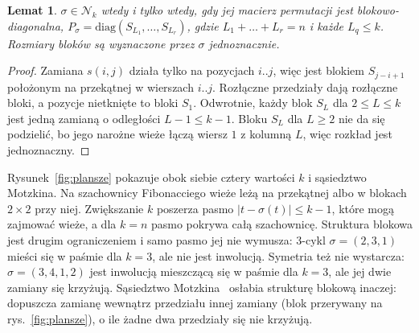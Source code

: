 \documentclass[letterpaper]{article} %
\newtheorem{lemma}{Lemat}
\theoremstyle{definition}
\newcommand{\N}{\mathcal{N}}
\begin{document}
\begin{lemma}\label{lem:bloki}
$\sigma\in\N_k$ wtedy i tylko wtedy, gdy jej macierz permutacji jest
blokowo-diagonalna, $P_\sigma=\mathrm{diag}(S_{L_1},\dots,S_{L_r})$, gdzie
$L_1+\dots+L_r=n$ i każde $L_q\leq k$. Rozmiary bloków są wyznaczone
przez $\sigma$ jednoznacznie.
\end{lemma}
\begin{proof}
Zamiana $s(i,j)$ działa tylko na pozycjach $i..j$, więc jest blokiem
$S_{j-i+1}$ położonym na przekątnej w wierszach $i..j$. Rozłączne
przedziały dają rozłączne bloki, a pozycje nietknięte to bloki $S_1$.
Odwrotnie, każdy blok $S_L$ dla $2\leq L\leq k$ jest jedną zamianą
o odległości $L-1\leq k-1$. Bloku $S_L$ dla $L\geq 2$ nie da się
podzielić, bo jego narożne wieże łączą wiersz $1$ z kolumną $L$, więc
rozkład jest jednoznaczny.
\end{proof}

Rysunek~\ref{fig:plansze} pokazuje obok siebie cztery wartości $k$ i sąsiedztwo Motzkina. Na szachownicy Fibonacciego wieże leżą na przekątnej albo w blokach $2\times 2$ przy niej. Zwiększanie $k$
poszerza pasmo $|t-\sigma(t)|\leq k-1$, które mogą zajmować wieże, a dla
$k=n$ pasmo pokrywa całą szachownicę. Struktura blokowa jest drugim
ograniczeniem i samo pasmo jej nie wymusza: $3$-cykl $\sigma=(2,3,1)$
mieści się w paśmie dla $k=3$, ale nie jest inwolucją. Symetria też nie wystarcza: $\sigma=(3,4,1,2)$
jest inwolucją mieszczącą się w paśmie dla $k=3$, ale jej dwie zamiany
się krzyżują. Sąsiedztwo
Motzkina~\cite{wojewodzki2026soco} osłabia strukturę blokową inaczej: dopuszcza zamianę wewnątrz przedziału innej zamiany (blok przerywany na rys.~\ref{fig:plansze}), o ile żadne dwa przedziały się
nie krzyżują.
\end{document}
